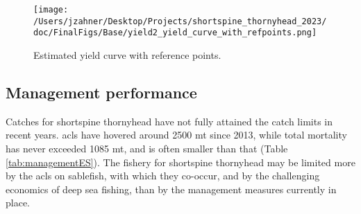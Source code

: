 \documentclass[11pt,
  english,
  letterpaper,
]{article}
\begin{document}
\begin{figure}
\centering
\texttt{[image: /Users/jzahner/Desktop/Projects/shortspine\_thornyhead\_2023/doc/FinalFigs/Base/yield2\_yield\_curve\_with\_refpoints.png]}
\caption{Estimated yield curve with reference points.\label{fig:yieldcurveES}}
\end{figure}

\hypertarget{management-performance}{%
\subsection*{Management performance}\label{management-performance}}

Catches for shortspine thornyhead have not fully attained the catch limits in recent years. \Gls{acl}s have hovered around 2500 mt since 2013, while total mortality has never exceeded 1085 mt, and is often smaller than that (Table \ref{tab:managementES}). The fishery for shortspine thornyhead may be limited more by the \gls{acl}s on sablefish, with which they co-occur, and by the challenging economics of deep sea fishing, than by the management measures currently in place. \begingroup\fontsize{10}{12}\selectfont \begingroup\fontsize{10}{12}\selectfont
\end{document}
